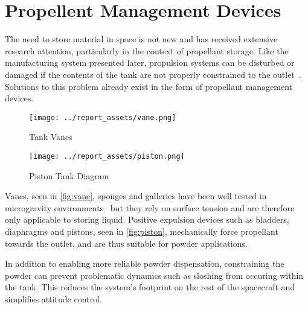 \section{Propellent Management Devices}
The need to store material in space is not new and has received extensive research attention, particularly in the context of propellant storage. Like the manufacturing system presented later, propulsion systems can be disturbed or damaged if the contents of the tank are not properly constrained to the outlet~\cite{Hartwig2016}. Solutions to this problem already exist in the form of propellant management devices.
\begin{figure}[htbp]
    \centering
    
    \begin{minipage}{0.25\textwidth}
        \centering
        \texttt{[image: ../report\_assets/vane.png]}
        \caption{Tank Vanes~\cite{Hartwig2016}}\label{fig:vane}
    \end{minipage}
    \hspace{3em}
    \begin{minipage}{0.47\textwidth}
        \centering
        \texttt{[image: ../report\_assets/piston.png]}
        \caption{Piston Tank Diagram~\cite{TANG2023118406}}\label{fig:piston}
    \end{minipage}
    
\end{figure}
Vanes, seen in \autoref{fig:vane}, sponges and galleries have been well tested in microgravity environments~\cite{Hartwig2016} but they rely on surface tension and are therefore only applicable to storing liquid. Positive expulsion devices such as bladders, diaphragms and pistons, seen in \autoref{fig:piston}, mechanically force propellant towards the outlet, and are thus suitable for powder applications. 

In addition to enabling more reliable powder dispensation, constraining the powder can prevent problematic dynamics such as sloshing from occuring within the tank. This reduces the system's footprint on the rest of the spacecraft and simplifies attitude control.


